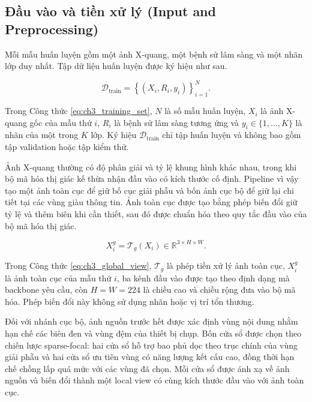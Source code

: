 \subsection{Đầu vào và tiền xử lý (Input and Preprocessing)}

Mỗi mẫu huấn luyện gồm một ảnh X-quang, một bệnh sử lâm sàng và một nhãn lớp duy nhất. Tập dữ liệu huấn luyện được ký hiệu như sau.

\begin{equation}\mathcal{D}_{\mathrm{train}}=\left\{\left(X_i,R_i,y_i\right)\right\}_{i=1}^{N}.\label{eq:ch3_training_set}\end{equation}

Trong Công thức \ref{eq:ch3_training_set}, $N$ là số mẫu huấn luyện, $X_i$ là ảnh X-quang gốc của mẫu thứ $i$, $R_i$ là bệnh sử lâm sàng tương ứng và $y_i\in\{1,\ldots,K\}$ là nhãn của một trong $K$ lớp. Ký hiệu $\mathcal{D}_{\mathrm{train}}$ chỉ tập huấn luyện và không bao gồm tập validation hoặc tập kiểm thử.

Ảnh X-quang thường có độ phân giải và tỷ lệ khung hình khác nhau, trong khi bộ mã hóa thị giác kế thừa nhận đầu vào có kích thước cố định. Pipeline vì vậy tạo một ảnh toàn cục để giữ bố cục giải phẫu và bốn ảnh cục bộ để giữ lại chi tiết tại các vùng giàu thông tin. Ảnh toàn cục được tạo bằng phép biến đổi giữ tỷ lệ và thêm biên khi cần thiết, sau đó được chuẩn hóa theo quy tắc đầu vào của bộ mã hóa thị giác.

\begin{equation}X_i^{g}=\mathcal{T}_{g}\left(X_i\right)\in\mathbb{R}^{3\times H\times W}.\label{eq:ch3_global_view}\end{equation}

Trong Công thức \ref{eq:ch3_global_view}, $\mathcal{T}_{g}$ là phép tiền xử lý ảnh toàn cục, $X_i^{g}$ là ảnh toàn cục của mẫu thứ $i$, ba kênh đầu vào được tạo theo định dạng mà backbone yêu cầu, còn $H=W=224$ là chiều cao và chiều rộng đưa vào bộ mã hóa. Phép biến đổi này không sử dụng nhãn hoặc vị trí tổn thương.

Đối với nhánh cục bộ, ảnh nguồn trước hết được xác định vùng nội dung nhằm hạn chế các biên đen và vùng đệm của thiết bị chụp. Bốn cửa sổ được chọn theo chiến lược sparse-focal: hai cửa sổ hỗ trợ bao phủ dọc theo trục chính của vùng giải phẫu và hai cửa sổ ưu tiên vùng có năng lượng kết cấu cao, đồng thời hạn chế chồng lấp quá mức với các vùng đã chọn. Mỗi cửa sổ được ánh xạ về ảnh nguồn và biến đổi thành một local view có cùng kích thước đầu vào với ảnh toàn cục.

